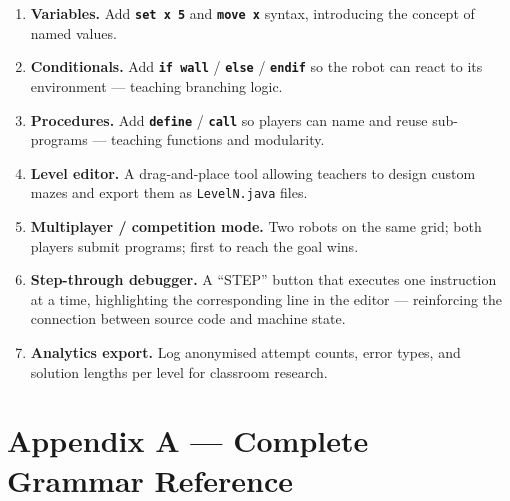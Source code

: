\documentclass[12pt,a4paper]{article}
\newcommand{\keyword}[1]{\textcolor{keyword}{\texttt{\bfseries #1}}}
\begin{document}
\begin{tcolorbox}[gddbox, title={Planned Future Extensions (Post-submission)}]
\begin{enumerate}[label=\textbf{F\arabic*.}, leftmargin=3em]
  \item \textbf{Variables.} Add \keyword{set x 5} and \keyword{move x} syntax, introducing the concept of named values.
  \item \textbf{Conditionals.} Add \keyword{if wall} / \keyword{else} / \keyword{endif} so the robot can react to its environment — teaching branching logic.
  \item \textbf{Procedures.} Add \keyword{define} / \keyword{call} so players can name and reuse sub-programs — teaching functions and modularity.
  \item \textbf{Level editor.} A drag-and-place tool allowing teachers to design custom mazes and export them as \texttt{LevelN.java} files.
  \item \textbf{Multiplayer / competition mode.} Two robots on the same grid; both players submit programs; first to reach the goal wins.
  \item \textbf{Step-through debugger.} A ``STEP'' button that executes one instruction at a time, highlighting the corresponding line in the editor — reinforcing the connection between source code and machine state.
  \item \textbf{Analytics export.} Log anonymised attempt counts, error types, and solution lengths per level for classroom research.
\end{enumerate}
\end{tcolorbox}

\section{Appendix A — Complete Grammar Reference}
\end{document}

